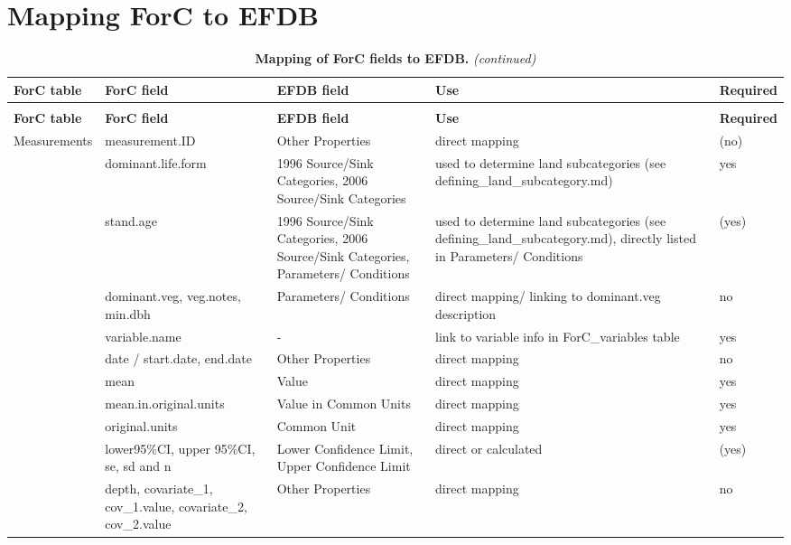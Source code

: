 \documentclass[, manuscript]{copernicus}
\begin{document}
\section{Mapping ForC to EFDB}

\begin{longtabu} to 
\caption{\label{tab:table_ForCfieldmapping}\textbf{Mapping of ForC fields to EFDB.}}\\
\hline
\textbf{ForC table} & \textbf{ForC field} & \textbf{EFDB field} & \textbf{Use} & \textbf{Required}\\
\hline
\endfirsthead
\caption[]{\textbf{Mapping of ForC fields to EFDB.} \textit{(continued)}}\\
\hline
\textbf{ForC table} & \textbf{ForC field} & \textbf{EFDB field} & \textbf{Use} & \textbf{Required}\\
\hline
\endhead
Measurements & measurement.ID & Other Properties & direct mapping & (no)\\
\hline
 & dominant.life.form & 1996 Source/Sink Categories, 2006 Source/Sink Categories & used to determine land subcategories (see defining\_land\_subcategory.md) & yes\\
\hline
 & stand.age & 1996 Source/Sink Categories, 2006 Source/Sink Categories, Parameters/ Conditions & used to determine land subcategories (see defining\_land\_subcategory.md), directly listed in Parameters/ Conditions & (yes)\\
\hline
 & dominant.veg, veg.notes, min.dbh & Parameters/ Conditions & direct mapping/ linking to dominant.veg description & no\\
\hline
 & variable.name & - & link to variable info in ForC\_variables table & yes\\
\hline
 & date / start.date, end.date & Other Properties & direct mapping & no\\
\hline
 & mean & Value & direct mapping & yes\\
\hline
 & mean.in.original.units & Value in Common Units & direct mapping & yes\\
\hline
 & original.units & Common Unit & direct mapping & yes\\
\hline
 & lower95\%CI, upper 95\%CI, se, sd and n & Lower Confidence Limit, Upper Confidence Limit & direct or calculated & (yes)\\
\hline
 & depth, covariate\_1, cov\_1.value, covariate\_2, cov\_2.value & Other Properties & direct mapping & no\\

\end{longtabu}
\end{document}
